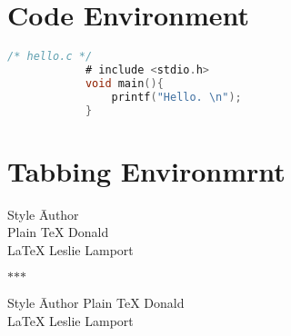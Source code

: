 \documentclass{article}
\begin{document}
    \section{Code Environment} 
        \lstset{
            numbers=left,
            numberstyle=\footnotesize,
            basicstyle=\sffamily,
            keywordstyle=\bfseries,
            commentstyle=\rmfamily\itshape,
            stringstyle=\ttfamily
        }                                               %
        \begin{lstlisting}[language=C]
            /* hello.c */
            # include <stdio.h>
            void main(){
                printf("Hello. \n"); 
            }
        \end{lstlisting}
        {
            \lstset{language=C}
        }

    \section{Tabbing Environmrnt}
        \begin{tabbing}
            Style\hspace{3em} \= Author \\
            Plain \TeX \> Donald \\
            LaTeX \> Leslie Lamport
        \end{tabbing}
        
        \noindent\hfill$*$\hfill$*$\hfill$*$\hfill

        \begin{tabbing}
            Style\hspace{3em} \= Author \kill
            Plain \TeX \> Donald \\
            LaTeX \> Leslie Lamport
        \end{tabbing}
\end{document}
